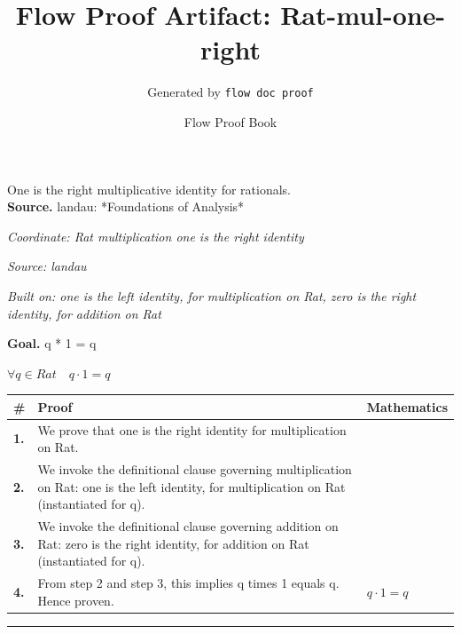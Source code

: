 \documentclass[11pt]{article}
\title{Flow Proof Artifact: Rat-mul-one-right}
\author{Generated by \texttt{flow doc proof}}
\date{Flow Proof Book}
\theoremstyle{definition}
\begin{document}
\maketitle
One is the right multiplicative identity for rationals.\\[0.5em]
\textbf{Source.} landau: *Foundations of Analysis*\\[0.5em]
\bigskip
{}\par
\smallskip\noindent\textit{Coordinate: Rat \cdot multiplication \cdot one is the right identity}\par
\smallskip\noindent\textit{Source: landau}\par
\smallskip\noindent\textit{Built on: one is the left identity, for multiplication on Rat, zero is the right identity, for addition on Rat}\par
\medskip
\noindent\textbf{Goal.} q * 1 = q\par
\noindent$\displaystyle \forall q \in Rat\quad q \cdot 1 = q$\par
\medskip
\noindent
\begin{tabular}{@{} >{\raggedright\arraybackslash}p{} >{\raggedright\arraybackslash}p{} >{\raggedleft\arraybackslash}p{} @{}}
\textbf{\#} & \textbf{Proof} & \textbf{Mathematics} \\
\midrule
\textbf{1.} & We prove that one is the right identity for multiplication on Rat. & \\[0.45em]
\textbf{2.} & We invoke the definitional clause governing multiplication on Rat: one is the left identity, for multiplication on Rat (instantiated for q). & \\[0.45em]
\textbf{3.} & We invoke the definitional clause governing addition on Rat: zero is the right identity, for addition on Rat (instantiated for q). & \\[0.45em]
\textbf{4.} & From step 2 and step 3, this implies q times 1 equals q. Hence proven. & $\displaystyle q \cdot 1 = q$ \\[0.45em]
\bottomrule
\end{tabular}
\label{thm:Rat-multiplication-one_is_the_right_identity}
\par\medskip\hrule
\end{document}
